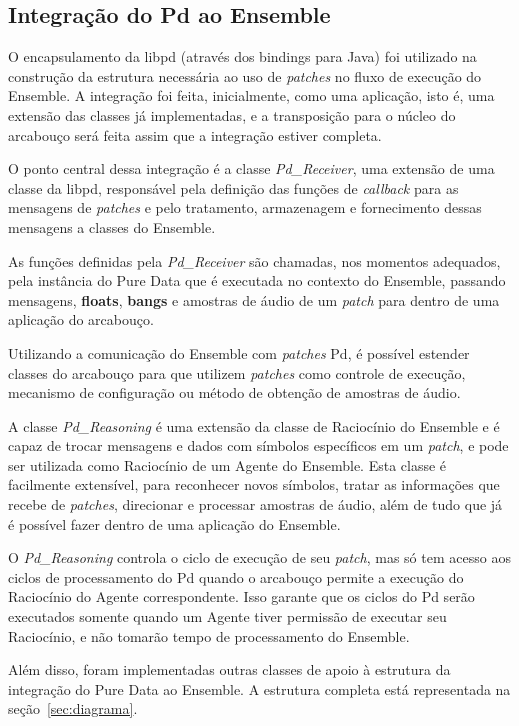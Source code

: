 \documentclass[a4paper, 11pt, twoside]{article}
\begin{document}
\begin{multicols}{2}
\section{Integração do Pd ao Ensemble}

O encapsulamento da libpd (através dos bindings para Java) foi utilizado na 
construção da estrutura necessária ao uso de \textit{patches} no fluxo de 
execução do Ensemble. A integração foi feita, inicialmente, como uma aplicação,
isto é, uma extensão das classes já implementadas, e a transposição para o 
núcleo do arcabouço será feita assim que a integração estiver completa.

O ponto central dessa integração é a classe \textit{Pd\_Receiver}, uma extensão
de uma classe da libpd, responsável pela definição das funções de 
\textit{callback} para as mensagens de \textit{patches} e pelo tratamento,
armazenagem e fornecimento dessas mensagens a classes do Ensemble.

As funções definidas pela \textit{Pd\_Receiver} são chamadas, nos momentos 
adequados, pela instância do Pure Data que é executada no contexto do Ensemble,
passando mensagens, \textbf{floats}, \textbf{bangs} e amostras de áudio
de um \textit{patch} para dentro de uma aplicação do arcabouço.

Utilizando a comunicação do Ensemble com \textit{patches} Pd, é possível
estender classes do arcabouço para que utilizem \textit{patches} como controle
de execução, mecanismo de configuração ou método de obtenção de amostras
de áudio.

A classe \textit{Pd\_Reasoning} é uma extensão da classe de Raciocínio
do Ensemble e é capaz de trocar mensagens e dados com símbolos específicos 
em um \textit{patch}, e pode ser utilizada como Raciocínio de um Agente do
Ensemble. Esta classe é facilmente extensível, para reconhecer novos símbolos,
tratar as informações que recebe de \textit{patches}, direcionar e processar
amostras de áudio, além de tudo que já é possível fazer dentro de uma aplicação do 
Ensemble.

O \textit{Pd\_Reasoning} controla o ciclo de execução de seu \textit{patch},
mas só tem acesso aos ciclos de processamento do Pd quando o arcabouço
permite a execução do Raciocínio do Agente correspondente. Isso garante
que os ciclos do Pd serão executados somente quando um Agente tiver
permissão de executar seu Raciocínio, e não tomarão tempo de processamento
do Ensemble.

Além disso, foram implementadas outras classes de apoio à estrutura da
integração do Pure Data ao Ensemble. A estrutura completa está representada
na seção~\ref{sec:diagrama}.


\end{multicols}
\end{document}
